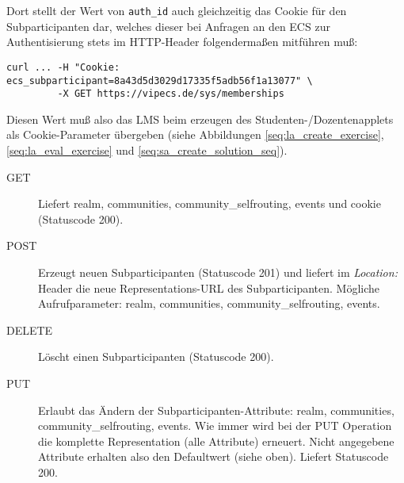 \documentclass[12pt,a4paper]{article}
\begin{document}
Dort stellt der Wert von \texttt{auth\_id} auch gleichzeitig das Cookie für den
Subparticipanten dar, welches dieser bei Anfragen an den ECS zur
Authentisierung stets im HTTP-Header folgendermaßen mitführen muß:
\begin{verbatim}
curl ... -H "Cookie: ecs_subparticipant=8a43d5d3029d17335f5adb56f1a13077" \
         -X GET https://vipecs.de/sys/memberships
\end{verbatim}
Diesen Wert muß also das LMS beim erzeugen des Studenten-/Dozentenapplets als
Cookie-Parameter übergeben (siehe Abbildungen \ref{seq:la_create_exercise},
\ref{seq:la_eval_exercise} und \ref{seq:sa_create_solution_seq}).
\begin{description}
  \item[GET] Liefert realm, communities, community\_selfrouting, events und cookie (Statuscode 200).
  \item[POST] Erzeugt neuen Subparticipanten (Statuscode 201) und liefert im \textit{Location:} Header die neue Representations-URL des Subparticipanten. Mögliche Aufrufparameter: realm, communities, community\_selfrouting, events.
  \item[DELETE] Löscht einen Subparticipanten (Statuscode 200).
  \item[PUT] Erlaubt das Ändern der Subparticipanten-Attribute: realm, communities, community\_selfrouting, events. Wie immer wird bei der PUT Operation die komplette Representation (alle Attribute) erneuert. Nicht angegebene Attribute erhalten also den Defaultwert (siehe oben). Liefert Statuscode 200.
\end{description}
\end{document}
